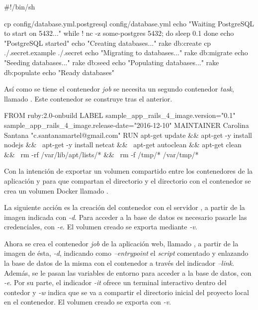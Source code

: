 \begin{codelisting}
\label{code:dockerfile}
\begin{code}
#!/bin/sh

cp config/database.yml.postgresql config/database.yml
echo "Waiting PostgreSQL to start on 5432..."
while ! nc -z some-postgres 5432; do
  sleep 0.1
done
echo "PostgreSQL started"
echo "Creating databases..."
rake db:create
cp ./.secret.example ./.secret
echo "Migrating to databases..."
rake db:migrate
echo "Seeding databases..."
rake db:seed
echo "Populating databases..."
rake db:populate
echo "Ready databases"
\end{code}
\end{codelisting}

Así como se tiene el contenedor \textit{job} se necesita un segundo contenedor \textit{task}, llamado . Este contenedor se construye tras el anterior.

\begin{codelisting}
\label{code:dockerfile}
\begin{code}
FROM ruby:2.0-onbuild
LABEL sample_app_rails_4_image.version="0.1" 
      sample_app_rails_4_image.release-date="2016-12-10"
MAINTAINER Carolina Santana "c.santanamartel@gmail.com"
RUN apt-get update && apt-get -y install nodejs && \
    apt-get -y install netcat && \
    apt-get autoclean && apt-get clean && \
    rm -rf /var/lib/apt/lists/* && \
    rm -f /tmp/* /var/tmp/*
\end{code}
\end{codelisting}

Con la intención de exportar un volumen compartido entre los contenedores de la aplicación y  para que compartan el directorio  y el directorio  con el contenedor  se crea un volumen Docker llamado .

La siguiente acción es la creación del contenedor  con el servidor , a partir de la imagen  indicada con \textit{\--d}. Para acceder a la base de datos es necesario pasarle las credenciales, con \textit{\--e}. El volumen creado se exporta mediante \textit{\--v}.

Ahora se crea el contenedor \textit{job} de la aplicación web, llamado \kode{app-job}, a partir de la imagen de ésta, \textit{\--d}, indicando como \textit{\---entrypoint} el \textit{script} comentado y enlazando la base de datos de la misma con el contenedor \kode{some-postgres} a través del indicador \textit{\---link}. Además, se le pasan las variables de entorno para acceder a la base de datos, con \textit{\--e}. Por su parte, el indicador \textit{\--it} ofrece un terminal interactivo dentro del contedor y \textit{\--w} indica que se va a compartir el directorio inicial del proyecto local en el contenedor. El volumen creado se exporta con \textit{\--v}.

